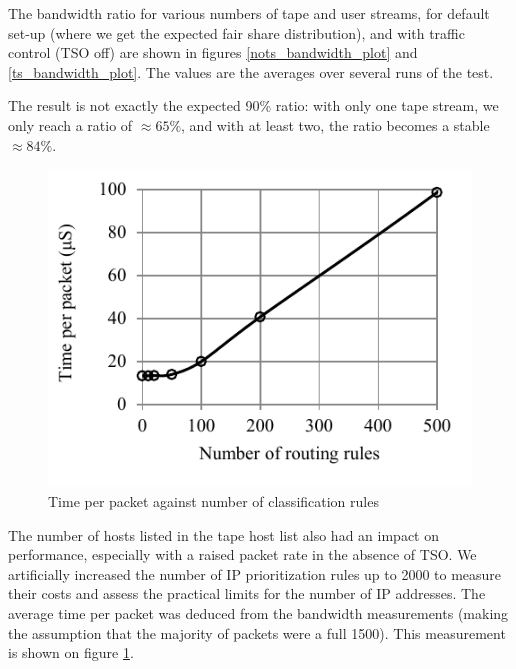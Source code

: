 \documentclass[a4paper]{jpconf}
\begin{document}
The bandwidth ratio for various numbers of tape and user streams, for default set-up (where we get the expected fair share distribution), and with traffic control (TSO off) are shown in figures \ref{nots_bandwidth_plot} and \ref{ts_bandwidth_plot}. The values are the averages over several runs of the test.

The result is not exactly the expected 90\% ratio: with only one tape stream, we only reach a ratio of $\approx65\%$, and with at least two, the ratio becomes a stable $\approx84\%$.

\begin{figure}
\begin{center}
\includegraphics{Time_per_packet}
\caption{\label{time_per_packet}Time per packet against number of classification rules}
\end{center}
\end{figure}

The number of hosts listed in the tape host list also had an impact on performance, especially with a raised packet rate in the absence of TSO. We artificially increased the number of IP prioritization rules up to 2000 to measure their costs and assess the practical limits for the number of IP addresses. The average time per packet was deduced from the bandwidth measurements (making the assumption that the majority of packets were a full \SI{1500}{\byte}). This measurement is shown on figure \ref{time_per_packet}.
\end{document}
